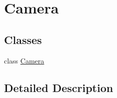 \hypertarget{group__gr___camera}{}\section{Camera}
\label{group__gr___camera}
\subsection*{Classes}
\begin{DoxyCompactItemize}
\item 
class \hyperlink{class_camera}{Camera}
\end{DoxyCompactItemize}


\subsection{Detailed Description}
